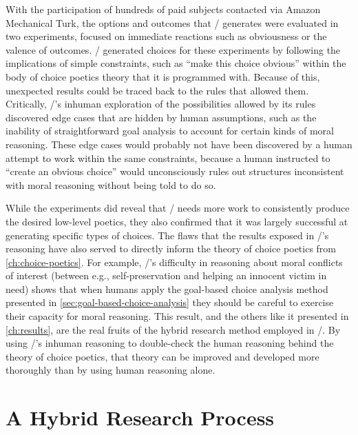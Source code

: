 With the participation of hundreds of paid subjects contacted via Amazon Mechanical Turk, the options and outcomes that \dunyazad/ generates were evaluated in two experiments, focused on immediate reactions such as obviousness or the valence of outcomes.
%
\dunyazad/ generated choices for these experiments by following the implications of simple constraints, such as ``make this choice obvious'' within the body of choice poetics theory that it is programmed with.
%
Because of this, unexpected results could be traced back to the rules that allowed them.
%
Critically, \dunyazad/'s inhuman exploration of the possibilities allowed by its rules discovered edge cases that are hidden by human assumptions, such as the inability of straightforward goal analysis to account for certain kinds of moral reasoning.
%
These edge cases would probably not have been discovered by a human attempt to work within the same constraints, because a human instructed to ``create an obvious choice'' would unconsciously rules out structures inconsistent with moral reasoning without being told to do so.


While the experiments did reveal that \dunyazad/ needs more work to consistently produce the desired low-level poetics, they also confirmed that it was largely successful at generating specific types of choices.
%
The flaws that the results exposed in \dunyazad/'s reasoning have also served to directly inform the theory of choice poetics from \cref{ch:choice-poetics}.
%
For example, \dunyazad/'s difficulty in reasoning about moral conflicts of interest (between e.g., self-preservation and helping an innocent victim in need) shows that when humans apply the goal-based choice analysis method presented in \cref{sec:goal-based-choice-analysis} they should be careful to exercise their capacity for moral reasoning.
%
This result, and the others like it presented in \cref{ch:results}, are the real fruits of the hybrid research method employed in \dunyazad/.
%
By using \dunyazad/'s inhuman reasoning to double-check the human reasoning behind the theory of choice poetics, that theory can be improved and developed more thoroughly than by using human reasoning alone.


\section{A Hybrid Research Process}

